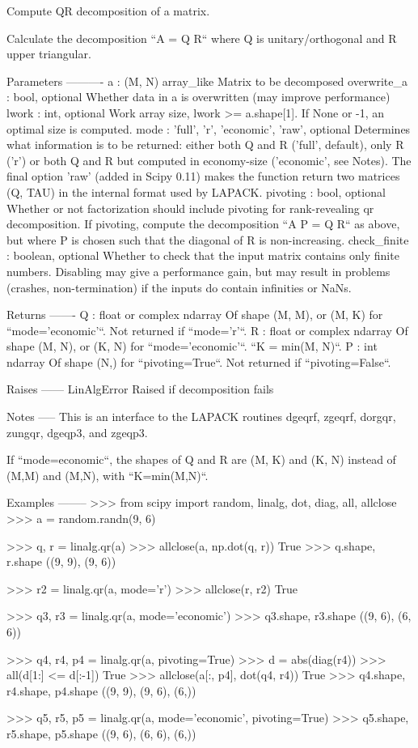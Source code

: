 \begin{DoxyVerb}Compute QR decomposition of a matrix.

Calculate the decomposition ``A = Q R`` where Q is unitary/orthogonal
and R upper triangular.

Parameters
----------
a : (M, N) array_like
    Matrix to be decomposed
overwrite_a : bool, optional
    Whether data in a is overwritten (may improve performance)
lwork : int, optional
    Work array size, lwork >= a.shape[1]. If None or -1, an optimal size
    is computed.
mode : {'full', 'r', 'economic', 'raw'}, optional
    Determines what information is to be returned: either both Q and R
    ('full', default), only R ('r') or both Q and R but computed in
    economy-size ('economic', see Notes). The final option 'raw'
    (added in Scipy 0.11) makes the function return two matrices
    (Q, TAU) in the internal format used by LAPACK.
pivoting : bool, optional
    Whether or not factorization should include pivoting for rank-revealing
    qr decomposition. If pivoting, compute the decomposition
    ``A P = Q R`` as above, but where P is chosen such that the diagonal
    of R is non-increasing.
check_finite : boolean, optional
    Whether to check that the input matrix contains only finite numbers.
    Disabling may give a performance gain, but may result in problems
    (crashes, non-termination) if the inputs do contain infinities or NaNs.

Returns
-------
Q : float or complex ndarray
    Of shape (M, M), or (M, K) for ``mode='economic'``.  Not returned
    if ``mode='r'``.
R : float or complex ndarray
    Of shape (M, N), or (K, N) for ``mode='economic'``.  ``K = min(M, N)``.
P : int ndarray
    Of shape (N,) for ``pivoting=True``. Not returned if
    ``pivoting=False``.

Raises
------
LinAlgError
    Raised if decomposition fails

Notes
-----
This is an interface to the LAPACK routines dgeqrf, zgeqrf,
dorgqr, zungqr, dgeqp3, and zgeqp3.

If ``mode=economic``, the shapes of Q and R are (M, K) and (K, N) instead
of (M,M) and (M,N), with ``K=min(M,N)``.

Examples
--------
>>> from scipy import random, linalg, dot, diag, all, allclose
>>> a = random.randn(9, 6)

>>> q, r = linalg.qr(a)
>>> allclose(a, np.dot(q, r))
True
>>> q.shape, r.shape
((9, 9), (9, 6))

>>> r2 = linalg.qr(a, mode='r')
>>> allclose(r, r2)
True

>>> q3, r3 = linalg.qr(a, mode='economic')
>>> q3.shape, r3.shape
((9, 6), (6, 6))

>>> q4, r4, p4 = linalg.qr(a, pivoting=True)
>>> d = abs(diag(r4))
>>> all(d[1:] <= d[:-1])
True
>>> allclose(a[:, p4], dot(q4, r4))
True
>>> q4.shape, r4.shape, p4.shape
((9, 9), (9, 6), (6,))

>>> q5, r5, p5 = linalg.qr(a, mode='economic', pivoting=True)
>>> q5.shape, r5.shape, p5.shape
((9, 6), (6, 6), (6,))\end{DoxyVerb}
